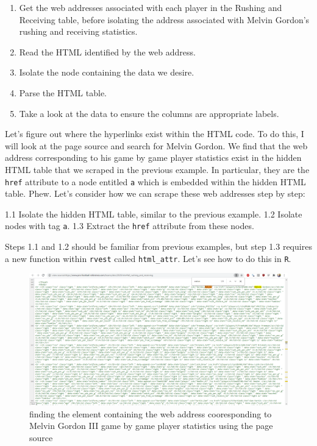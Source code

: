 \documentclass[
]{article}
\providecommand{\tightlist}{%
  \setlength{\itemsep}{0pt}\setlength{\parskip}{0pt}}
\begin{document}
\begin{enumerate}
\def\labelenumi{\arabic{enumi}.}
\tightlist
\item
  Get the web addresses associated with each player in the Rushing and Receiving table, before isolating the address associated with Melvin Gordon's rushing and receiving statistics.
\item
  Read the HTML identified by the web address.
\item
  Isolate the node containing the data we desire.
\item
  Parse the HTML table.
\item
  Take a look at the data to ensure the columns are appropriate labels.
\end{enumerate}

Let's figure out where the hyperlinks exist within the HTML code. To do this, I will look at the page source and search for Melvin Gordon. We find that the web address corresponding to his game by game player statistics exist in the hidden HTML table that we scraped in the previous example. In particular, they are the \texttt{href} attribute to a node entitled \texttt{a} which is embedded within the hidden HTML table. Phew. Let's consider how we can scrape these web addresses step by step:

1.1 Isolate the hidden HTML table, similar to the previous example.
1.2 Isolate nodes with tag \texttt{a}.
1.3 Extract the \texttt{href} attribute from these nodes.

Steps 1.1 and 1.2 should be familiar from previous examples, but step 1.3 requires a new function within \texttt{rvest} called \texttt{html\_attr}. Let's see how to do this in \texttt{R}.

\begin{figure}

{\centering \includegraphics[width=22.22in]{src/images/broncos_gordon_page_source} 

}

\caption{finding the element containing the web address cooresponding to Melvin Gordon III game by game player statistics using the page source}\label{fig:unnamed-chunk-42}
\end{figure}
\end{document}
